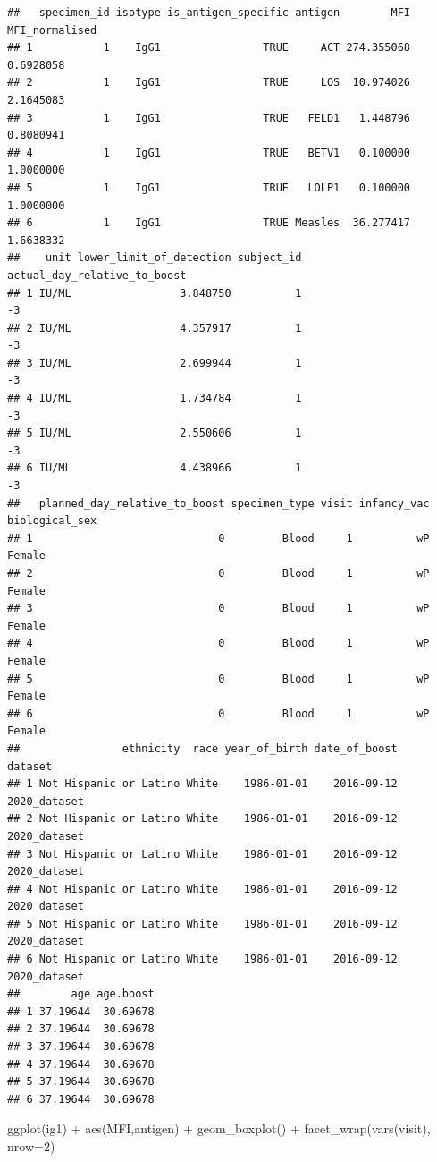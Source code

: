 \documentclass[
]{article}
\newenvironment{Shaded}{\begin{snugshade}}{\end{snugshade}}
\newcommand{\AttributeTok}[1]{\textcolor[rgb]{0.77,0.63,0.00}{#1}}
\newcommand{\DecValTok}[1]{\textcolor[rgb]{0.00,0.00,0.81}{#1}}
\newcommand{\FunctionTok}[1]{\textcolor[rgb]{0.00,0.00,0.00}{#1}}
\newcommand{\NormalTok}[1]{#1}
\newcommand{\SpecialCharTok}[1]{\textcolor[rgb]{0.00,0.00,0.00}{#1}}
\begin{document}
\begin{verbatim}
##   specimen_id isotype is_antigen_specific antigen        MFI MFI_normalised
## 1           1    IgG1                TRUE     ACT 274.355068      0.6928058
## 2           1    IgG1                TRUE     LOS  10.974026      2.1645083
## 3           1    IgG1                TRUE   FELD1   1.448796      0.8080941
## 4           1    IgG1                TRUE   BETV1   0.100000      1.0000000
## 5           1    IgG1                TRUE   LOLP1   0.100000      1.0000000
## 6           1    IgG1                TRUE Measles  36.277417      1.6638332
##    unit lower_limit_of_detection subject_id actual_day_relative_to_boost
## 1 IU/ML                 3.848750          1                           -3
## 2 IU/ML                 4.357917          1                           -3
## 3 IU/ML                 2.699944          1                           -3
## 4 IU/ML                 1.734784          1                           -3
## 5 IU/ML                 2.550606          1                           -3
## 6 IU/ML                 4.438966          1                           -3
##   planned_day_relative_to_boost specimen_type visit infancy_vac biological_sex
## 1                             0         Blood     1          wP         Female
## 2                             0         Blood     1          wP         Female
## 3                             0         Blood     1          wP         Female
## 4                             0         Blood     1          wP         Female
## 5                             0         Blood     1          wP         Female
## 6                             0         Blood     1          wP         Female
##                ethnicity  race year_of_birth date_of_boost      dataset
## 1 Not Hispanic or Latino White    1986-01-01    2016-09-12 2020_dataset
## 2 Not Hispanic or Latino White    1986-01-01    2016-09-12 2020_dataset
## 3 Not Hispanic or Latino White    1986-01-01    2016-09-12 2020_dataset
## 4 Not Hispanic or Latino White    1986-01-01    2016-09-12 2020_dataset
## 5 Not Hispanic or Latino White    1986-01-01    2016-09-12 2020_dataset
## 6 Not Hispanic or Latino White    1986-01-01    2016-09-12 2020_dataset
##        age age.boost
## 1 37.19644  30.69678
## 2 37.19644  30.69678
## 3 37.19644  30.69678
## 4 37.19644  30.69678
## 5 37.19644  30.69678
## 6 37.19644  30.69678
\end{verbatim}

\begin{Shaded}
\begin{Highlighting}[]
\FunctionTok{ggplot}\NormalTok{(ig1) }\SpecialCharTok{+}
  \FunctionTok{aes}\NormalTok{(MFI,antigen) }\SpecialCharTok{+}
  \FunctionTok{geom\_boxplot}\NormalTok{() }\SpecialCharTok{+} 
  \FunctionTok{facet\_wrap}\NormalTok{(}\FunctionTok{vars}\NormalTok{(visit), }\AttributeTok{nrow=}\DecValTok{2}\NormalTok{)}
\end{Highlighting}
\end{Shaded}
\end{document}
